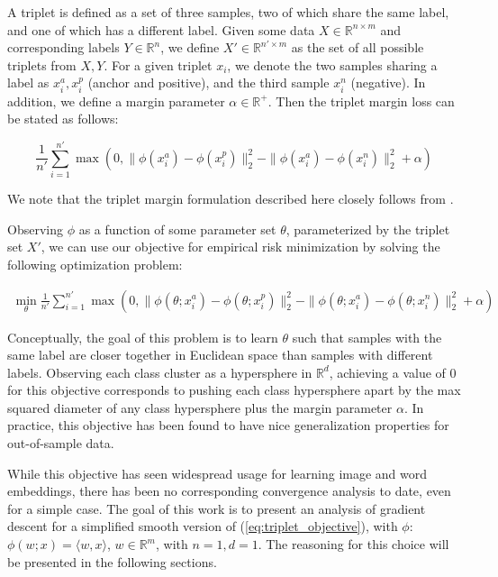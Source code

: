 \documentclass[11pt]{article}
\begin{document}
A triplet is defined as a set of three samples, two of which share the same label, and one of which has a different label. Given some data $X \in \mathbb{R}^{n \times m}$ and corresponding labels $Y \in \mathbb{R}^n$, we define $X' \in \mathbb{R}^{n' \times m}$ as the set of all possible triplets from $X, Y$. For a given triplet $x_i$, we denote the two samples sharing a label as $x_i^a, x_i^p$ (anchor and positive), and the third sample $x_i^n$ (negative). In addition, we define a margin parameter $\alpha \in \mathbb{R}^+$. Then the triplet margin loss can be stated as follows:

\begin{equation}
    \frac{1}{n'} \sum_{i=1}^{n'} \max(0, \| \phi(x_i^a) - \phi(x_i^p)\|_2^2 - \| \phi(x_i^a) - \phi(x_i^n)\|_2^2 + \alpha)
\end{equation}

We note that the triplet margin formulation described here closely follows from \cite{schroff_facenet_2015}.

Observing $\phi$ as a function of some parameter set $\theta$, parameterized by the triplet set $X'$, we can use our objective for empirical risk minimization by solving the following optimization problem:

\begin{equation}
\label{eq:triplet_objective}
\begin{aligned}
    \min_{\theta} \frac{1}{n'} \sum_{i=1}^{n'} \max(0, \| \phi(\theta; x_i^a) - \phi(\theta; x_i^p)\|_2^2 - \| \phi(\theta; x_i^a) - \phi(\theta; x_i^n)\|_2^2 + \alpha)
\end{aligned}
\end{equation}

Conceptually, the goal of this problem is to learn $\theta$ such that samples with the same label are closer together in Euclidean space than samples with different labels. Observing each class cluster as a hypersphere in $\mathbb{R}^d$, achieving a value of $0$ for this objective corresponds to pushing each class hypersphere apart by the max squared diameter of any class hypersphere plus the margin parameter $\alpha$. In practice, this objective has been found to have nice generalization properties for out-of-sample data.

While this objective has seen widespread usage for learning image and word embeddings, there has been no corresponding convergence analysis to date, even for a simple case. The goal of this work is to present an analysis of gradient descent for a simplified smooth version of (\ref{eq:triplet_objective}), with $\phi$: $\phi(w; x) = \langle w, x \rangle$, $w \in \mathbb{R}^{m}$, with $n=1, d=1$. The reasoning for this choice will be presented in the following sections.
\end{document}
